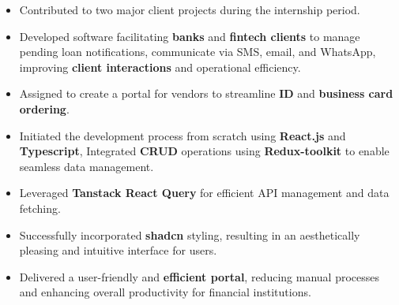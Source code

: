 \documentclass[10pt,a4paper,ragged2e]{altacv}
\begin{document}
\begin{itemize}
\item Contributed to two major client projects during the internship period. 
\smallskip
\item Developed software facilitating \textbf{banks} and \textbf{fintech clients} to manage pending loan notifications, communicate via SMS, email, and WhatsApp, improving \textbf{client interactions} and operational efficiency.
\smallskip
\item Assigned to create a portal for vendors to streamline \textbf{ID} and \textbf{business card ordering}.
\smallskip
\item Initiated the development process from scratch using \textbf{React.js} and \textbf{Typescript}, Integrated \textbf{CRUD} operations using \textbf{Redux-toolkit} to enable seamless data management.
\smallskip
\item Leveraged \textbf{Tanstack React Query} for efficient API management and data fetching.
\smallskip
\item Successfully incorporated \textbf{shadcn} styling, resulting in an aesthetically pleasing and intuitive interface for users.
\smallskip
\item Delivered a user-friendly and \textbf{efficient portal}, reducing manual processes and enhancing overall productivity for financial institutions.
\end{itemize}


\end{document}
